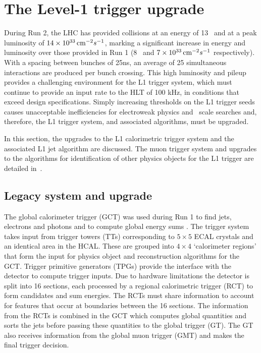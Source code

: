 \chapter{The Level-1 trigger upgrade} %
\label{cha:triggerUpgrade}

During Run 2, the LHC has provided collisions at an energy of 13 \TeV~and at  
a peak luminosity of $14\times10^{33}\,\text{cm}^{-2}s^{-1}$, marking a significant increase
in energy and luminosity over those provided in Run 1 (8 \TeV~and $7\times10^{33}\,\text{cm}^{-2}s^{-1}$ respectively).
With a spacing between bunches of 25ns, an average of 25 simultaneous interactions are 
produced per bunch crossing. This high luminosity and pileup provides a challenging
environment for the L1 trigger system, which must continue to provide 
an input rate to the HLT of 100 kHz, in conditions that exceed design specifications. 
Simply increasing thresholds on the L1 trigger seeds causes
unacceptable inefficiencies for electroweak physics and \TeV~scale searches
and, therefore, the L1 trigger system, and associated algorithms, must be upgraded. 

In this section, the upgrades to the L1 calorimetric trigger system and the 
associated L1 jet algorithm are discussed. The muon trigger system 
and upgrades to the algorithms for identification of other physics objects for 
the L1 trigger are detailed in~\cite{ele_algo,tau_algo,muon_algo}.


\section{Legacy system and upgrade}

The global calorimeter trigger (GCT) was used during Run 1 to find jets, electrons and photons and to 
compute global energy sums \cite{gct}. The trigger system takes input from trigger towers (TTs) 
corresponding to $5\times5$ ECAL crystals and an identical area in the HCAL. 
These are grouped into $4\times4$ `calorimeter regions' that form the input for physics object and
reconstruction algorithms for the GCT. Trigger primitive generators (TPGs) provide the interface
with the detector to compute trigger inputs. Due to hardware limitations the detector is split into 16 
sections, each processed by a regional calorimetric trigger (RCT) to form candidates and sum 
energies. The RCTs must share information to account for features that occur at boundaries between 
the 16 sections. The information from the RCTs is combined in the GCT which computes global quantities and sorts 
the jets before passing these quantities to the global trigger (GT). The GT also receives information 
from the global muon trigger (GMT) and makes the final trigger decision. 

